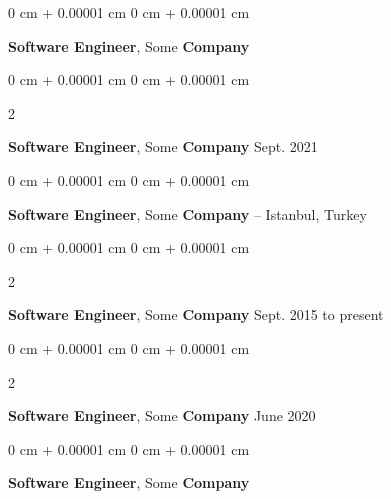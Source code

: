 \documentclass[10pt, letterpaper]{article}
\newenvironment{onecolentry}{
    \begin{adjustwidth}{
        0 cm + 0.00001 cm
    }{
        0 cm + 0.00001 cm
    }
}{
    \end{adjustwidth}
} %
\newenvironment{twocolentry}[2][]{
    \onecolentry
    \def\secondColumn{#2}
    \setcolumnwidth{\fill, 4.5 cm}
    \begin{paracol}{2}
}{
    \switchcolumn \raggedleft \secondColumn
    \end{paracol}
    \endonecolentry
} %
\begin{document}
        
        \begin{onecolentry}
            \textbf{Software Engineer}, Some \textbf{Company}\end{onecolentry}



        \vspace{0.2 cm}

        \begin{twocolentry}{
            Sept. 2021
        }
            \textbf{Software Engineer}, Some \textbf{Company}\end{twocolentry}



        \vspace{0.2 cm}

        \begin{onecolentry}
            \textbf{Software Engineer}, Some \textbf{Company} -- Istanbul, Turkey\end{onecolentry}



        \vspace{0.2 cm}

        \begin{twocolentry}{
            Sept. 2015 to present
        }
            \textbf{Software Engineer}, Some \textbf{Company}\end{twocolentry}



        \vspace{0.2 cm}

        \begin{twocolentry}{
            June 2020
        }
            \textbf{Software Engineer}, Some \textbf{Company}\end{twocolentry}



        \vspace{0.2 cm}

        \begin{onecolentry}
            \textbf{Software Engineer}, Some \textbf{Company}\end{onecolentry}
\end{document}
